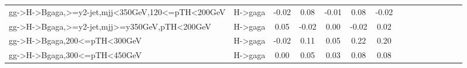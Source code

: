 \begin{tabular}{l|l|c|c|c|c|c|c|c|c|c|c|c|c|c}
\cline{1-7}
gg->H->Bgaga,>=y2-jet,mjj<350GeV,120<=pTH<200GeV & H->gaga & {\cellcolor[HTML]{F8F5F1}} \color[HTML]{000000} -0.02 & {\cellcolor[HTML]{EAEBF2}} \color[HTML]{000000} 0.08 & {\cellcolor[HTML]{F7F6F3}} \color[HTML]{000000} -0.01 & {\cellcolor[HTML]{EAEBF2}} \color[HTML]{000000} 0.08 & {\cellcolor[HTML]{F8F5F1}} \color[HTML]{000000} -0.02 \\
\cline{1-7}
gg->H->Bgaga,>=y2-jet,mjj>=y350GeV,pTH<200GeV & H->gaga & {\cellcolor[HTML]{EFF0F4}} \color[HTML]{000000} 0.05 & {\cellcolor[HTML]{F8F5F1}} \color[HTML]{000000} -0.02 & {\cellcolor[HTML]{F6F6F7}} \color[HTML]{000000} 0.00 & {\cellcolor[HTML]{F8F5F1}} \color[HTML]{000000} -0.02 & {\cellcolor[HTML]{F4F4F6}} \color[HTML]{000000} 0.02 \\
\cline{1-7}
gg->H->Bgaga,200<=pTH<300GeV & H->gaga & {\cellcolor[HTML]{F8F5F1}} \color[HTML]{000000} -0.02 & {\cellcolor[HTML]{E5E7F0}} \color[HTML]{000000} 0.11 & {\cellcolor[HTML]{EFF0F4}} \color[HTML]{000000} 0.05 & {\cellcolor[HTML]{D4D4E8}} \color[HTML]{000000} 0.22 & {\cellcolor[HTML]{D8DAEB}} \color[HTML]{000000} 0.20 \\
\cline{1-7}
gg->H->Bgaga,300<=pTH<450GeV & H->gaga & {\cellcolor[HTML]{F6F6F7}} \color[HTML]{000000} 0.00 & {\cellcolor[HTML]{EFF0F4}} \color[HTML]{000000} 0.05 & {\cellcolor[HTML]{F3F3F5}} \color[HTML]{000000} 0.03 & {\cellcolor[HTML]{EAEBF2}} \color[HTML]{000000} 0.08 & {\cellcolor[HTML]{EAEBF2}} \color[HTML]{000000} 0.08 \\
\end{tabular}
